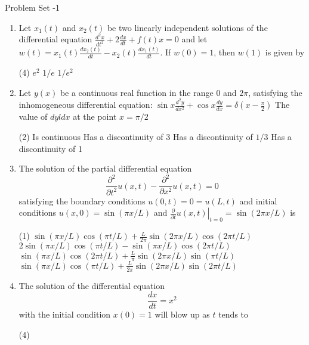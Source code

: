 \newpage
\begin{abox}
	Problem Set -1
\end{abox}
\begin{enumerate}[label=\color{ocre}\textbf{\arabic*.}]	
	\item Let $x_{1}(t)$ and $x_{2}(t)$ be two linearly independent solutions of the differential equation $\frac{d^{2} x}{d t^{2}}+2 \frac{d x}{d t}+f(t) x=0$ and let $w(t)=x_{1}(t) \frac{d x_{2}(t)}{d t}-x_{2}(t) \frac{d x_{1}(t)}{d t} .$ If $w(0)=1$, then $w(1)$ is given by
	{}
			\begin{tasks}(4)
			\task[\textbf{B.}] $e^{2}$
			\task[\textbf{C.}]  $1 / e$
			\task[\textbf{D.}] $1 / e^{2}$
		\end{tasks}
\item Let $y(x)$ be a continuous real function in the range 0 and $2 \pi$, satisfying the inhomogeneous differential equation: $\sin x \frac{d^{2} y}{d x^{2}}+\cos x \frac{d y}{d x}=\delta\left(x-\frac{\pi}{2}\right)$ The value of $d y l d x$ at the point $x=\pi / 2$
{}
\begin{tasks}(2)
	\task[\textbf{A.}] Is continuous
	\task[\textbf{B.}] Has a discontinuity of 3
	\task[\textbf{C.}] Has a discontinuity of $1 / 3$
	\task[\textbf{D.}] Has a discontinuity of 1
\end{tasks}
\item The solution of the partial differential equation
$$
\frac{\partial^{2}}{\partial t^{2}} u(x, t)-\frac{\partial^{2}}{\partial x^{2}} u(x, t)=0
$$
satisfying the boundary conditions $u(0, t)=0=u(L, t)$ and initial conditions $u(x, 0)=\sin (\pi x / L)$ and $\left.\frac{\partial}{\partial t} u(x, t)\right|_{t=0}=\sin (2 \pi x / L)$ is
{}
	\begin{tasks}(1)
		\task[\textbf{A.}] $\sin (\pi x / L) \cos (\pi t / L)+\frac{L}{2 \pi} \sin (2 \pi x / L) \cos (2 \pi t / L)$
		\task[\textbf{B.}] $2 \sin (\pi x / L) \cos (\pi t / L)-\sin (\pi x / L) \cos (2 \pi t / L)$
		\task[\textbf{C.}] $\sin (\pi x / L) \cos (2 \pi t / L)+\frac{L}{\pi} \sin (2 \pi x / L) \sin (\pi t / L)$
		\task[\textbf{D.}] $\sin (\pi x / L) \cos (\pi t / L)+\frac{L}{2 \pi} \sin (2 \pi x / L) \sin (2 \pi t / L)$
	\end{tasks}
	\item The solution of the differential equation
	$$
	\frac{d x}{d t}=x^{2}
	$$
	with the initial condition $x(0)=1$ will blow up as $t$ tends to
	{}
	\begin{tasks}(4)

\end{tasks}
\end{enumerate}
